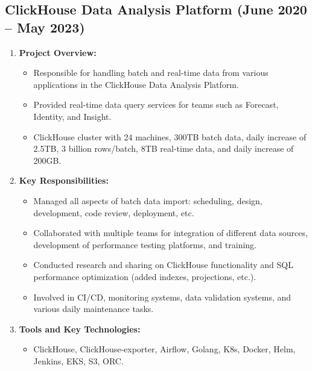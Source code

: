\documentclass{resume}
\begin{document}
\subsection*{ClickHouse Data Analysis Platform (June 2020 -- May 2023)}
\begin{enumerate}
    \item \textbf{Project Overview:}
    \begin{itemize}
        \item Responsible for handling batch and real-time data from various applications in the ClickHouse Data Analysis Platform.
        \item Provided real-time data query services for teams such as Forecast, Identity, and Insight.
        \item ClickHouse cluster with 24 machines, 300TB batch data, daily increase of 2.5TB, 3 billion rows/batch, 8TB real-time data, and daily increase of 200GB.
    \end{itemize}

    \item \textbf{Key Responsibilities:}
    \begin{itemize}
        \item Managed all aspects of batch data import: scheduling, design, development, code review, deployment, etc.
        \item Collaborated with multiple teams for integration of different data sources, development of performance testing platforms, and training.
        \item Conducted research and sharing on ClickHouse functionality and SQL performance optimization (added indexes, projections, etc.).
        \item Involved in CI/CD, monitoring systems, data validation systems, and various daily maintenance tasks.
    \end{itemize}

    \item \textbf{Tools and Key Technologies:}
    \begin{itemize}
        \item ClickHouse, ClickHouse-exporter, Airflow, Golang, K8s, Docker, Helm, Jenkins, EKS, S3, ORC.
    \end{itemize}


\end{enumerate}
\end{document}
